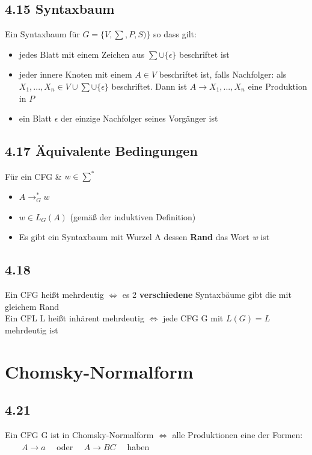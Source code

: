 \documentclass[11pt]{article}
\begin{document}
\subsection{4.15 Syntaxbaum}
\label{sec:org64830aa}
Ein Syntaxbaum für \(G = \{V, \sum, P, S)\}\) so dass gilt:
\begin{itemize}
\item jedes Blatt mit einem Zeichen aus \(\sum \cup \{\epsilon\}\) beschriftet ist
\item jeder innere Knoten mit einem \(A\in V\) beschriftet ist, falls Nachfolger: als \(X_1, ..., X_n \in V\cup \sum \cup \{\epsilon\}\) beschriftet. Dann ist \(A \rightarrow X_1, ..., X_n\) eine Produktion in \(P\)
\item ein Blatt \(\epsilon\) der einzige Nachfolger seines Vorgänger ist
\end{itemize}

\subsection{4.17 Äquivalente Bedingungen}
\label{sec:orgf3ecff4}
Für ein CFG \& \(w \in \sum^*\)
\begin{itemize}
\item \(A\rightarrow_G^* w\)
\item \(w\in L_G(A)\) (gemäß der induktiven Definition)
\item Es gibt ein Syntaxbaum mit Wurzel A dessen \textbf{Rand} das Wort \emph{w} ist
\end{itemize}

\subsection{4.18}
\label{sec:org28ab36a}
Ein CFG heißt mehrdeutig \(\iff\) es 2 \textbf{verschiedene} Syntaxbäume gibt die mit gleichem Rand \\
Ein CFL L heißt inhärent mehrdeutig \(\iff\) jede CFG G mit \(L(G) = L\) mehrdeutig ist

\section{Chomsky-Normalform}
\label{sec:org46b3acd}
\subsection{4.21}
\label{sec:org7d2dd35}
Ein CFG G ist in Chomsky-Normalform \(\iff\) alle Produktionen eine der Formen:
\(\qquad A \rightarrow a\quad\) oder \(\quad A\rightarrow BC\quad\) haben
\end{document}
